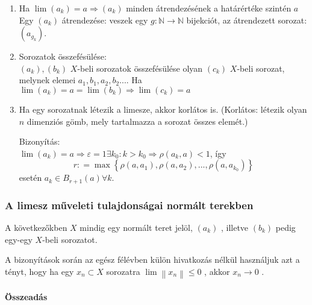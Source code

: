 \documentclass[]{scrartcl}
\let\oldparagraph\paragraph
\renewcommand{\paragraph}[1]{\oldparagraph{#1}\mbox{}}
\newenvironment{bizonyitas}{}{}
\begin{document}
\begin{enumerate}
\begin{bizonyitas}
  \end{bizonyitas}
\item
  Ha
  \(\left. \lim\left( a_{k} \right) = a\Rightarrow\left( a_{k} \right) \right.\)
  minden átrendezésének a határértéke szintén \(a\)\\
  Egy \(\left( a_{k} \right)\) átrendezése: veszek egy
  \(\left. g:{\mathbb{N}}\rightarrow{\mathbb{N}} \right.\) bijekciót, az
  átrendezett sorozat: \(\left( a_{g_{k}} \right)\).
\item
  Sorozatok összefésülése:\\
  \(\left( a_{k} \right),\left( b_{k} \right)\) \(X\)-beli sorozatok
  összefésülése olyan \(\left( c_{k} \right)\) \(X\)-beli sorozat,
  melynek elemei \(a_{1},b_{1},a_{2},b_{2}...\). Ha
  \(\left. \lim\left( a_{k} \right) = a = \lim\left( b_{k} \right)\Rightarrow\lim\left( c_{k} \right) = a \right.\)
\item
  Ha egy sorozatnak létezik a limesze, akkor korlátos is. (Korlátos:
  létezik olyan \(n\) dimenziós gömb, mely tartalmazza a sorozat összes
  elemét.)

  \begin{bizonyitas}

  Bizonyítás:\\
  \(\left. \lim\left( a_{k} \right) = a\Rightarrow\varepsilon = 1\exists k_{0}:k > k_{0}\Rightarrow\rho\left( {a_{k},a} \right) < 1 \right.\),
  így
  \[r: = \max\left\{ {\rho\left( {a,a_{1}} \right),\rho\left( {a,a_{2}} \right),...,\rho\left( {a,a_{k_{0}}} \right)} \right\}\]
  esetén \(a_{k} \in B_{r + 1}\left( a \right)\forall k\).

  \end{bizonyitas}
\end{enumerate}

\subsubsection{A limesz műveleti tulajdonságai normált
terekben}\label{a-limesz-muveleti-tulajdonsagai-normalt-terekben}

A következőkben \(X\) mindig egy normált teret jelöl,
\(\left( a_{k} \right)\) , illetve \(\left( b_{k} \right)\) pedig
egy-egy \(X\)-beli sorozatot.

A bizonyítások során az egész félévben külön hivatkozás nélkül
használjuk azt a tényt, hogy ha egy \(x_{n} \subset X\) sorozatra
\(\lim\left\| x_{n} \right\| \leq 0\) , akkor
\(\left. x_{n}\rightarrow 0 \right.\) .

\paragraph{Összeadás}\label{osszeadas}
\end{document}
